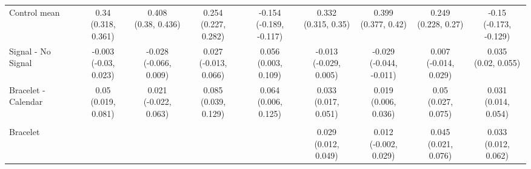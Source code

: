 {\begin{tabular}[t]{lcccccccc}
\addlinespace \addlinespace \hspace{1em}Control mean & \makecell[c]{0.34\\(0.318, 0.361)} & \makecell[c]{0.408\\(0.38, 0.436)} & \makecell[c]{0.254\\(0.227, 0.282)} & \makecell[c]{-0.154\\(-0.189, -0.117)} & \makecell[c]{0.332\\(0.315, 0.35)} & \makecell[c]{0.399\\(0.377, 0.42)} & \makecell[c]{0.249\\(0.228, 0.27)} & \makecell[c]{-0.15\\(-0.173, -0.129)}\\
\addlinespace \addlinespace \hspace{1em}Signal - No Signal & \makecell[c]{-0.003\\(-0.03, 0.023)} & \makecell[c]{-0.028\\(-0.066, 0.009)} & \makecell[c]{0.027\\(-0.013, 0.066)} & \makecell[c]{0.056\\(0.003, 0.109)} & \makecell[c]{-0.013\\(-0.029, 0.005)} & \makecell[c]{-0.029\\(-0.044, -0.011)} & \makecell[c]{0.007\\(-0.014, 0.029)} & \makecell[c]{0.035\\(0.02, 0.055)}\\
\addlinespace \addlinespace \hspace{1em}Bracelet - Calendar & \makecell[c]{0.05\\(0.019, 0.081)} & \makecell[c]{0.021\\(-0.022, 0.063)} & \makecell[c]{0.085\\(0.039, 0.129)} & \makecell[c]{0.064\\(0.006, 0.125)} & \makecell[c]{0.033\\(0.017, 0.051)} & \makecell[c]{0.019\\(0.006, 0.036)} & \makecell[c]{0.05\\(0.027, 0.075)} & \makecell[c]{0.031\\(0.014, 0.054)}\\
\addlinespace \addlinespace \addlinespace[0.3em]
\hline
\multicolumn{9}{l}{\textit{\textbf{Panel B: Signalling}}}\\
\hline
\hspace{1em}Bracelet &  &  &  &  & \makecell[c]{0.029\\(0.012, 0.049)} & \makecell[c]{0.012\\(-0.002, 0.029)} & \makecell[c]{0.045\\(0.021, 0.076)} & \makecell[c]{0.033\\(0.012, 0.062)}\\

\end{tabular}}
